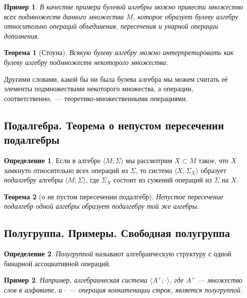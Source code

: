 \documentclass{article}
\newtheorem*{theorem*}{Теорема}
\theoremstyle{plain}
\newtheorem*{example*}{Пример}
\theoremstyle{definition}
\newtheorem{definition}{Определение}[subsection]
\begin{document}
\begin{example*}
	В качестве примера булевой алгебры можно привести множество всех подмножеств данного множества \(M\), которое образует булеву алгебру относительно операций объединения, пересечения и унарной операции дополнения.
\end{example*}

\begin{theorem*}[Стоуна]
	Всякую булеву алгебру можно интерпретировать как булеву алгебру подмножеств некоторого множества.
\end{theorem*}

Другими словами, какой бы ни была булева алгебра мы можем считать её элементы подмножествами некоторого множества, а операции, соответственно,~--- теоретико-множественными операциями.

\subsection{Подалгебра. Теорема о непустом пересечении подалгебры}

\begin{definition}
	Если в алгебре \(\langle M; \Sigma \rangle\) мы рассмотрим \(X \subset M\) такое, что \(X\) замкнуто относительно всех операций из \(\Sigma\), то система \(\langle X; \Sigma_X \rangle\) образует \textit{подалгебру} алгебры \(\langle M; \Sigma \rangle\), где \(\Sigma_X\) состоит из сужений операций из \(\Sigma\) на \(X\).
\end{definition}

\begin{theorem*}[о не пустом пересечении подалгебр]
	Непустое пересечение подалгебр одной алгебры образует подалгебру той же алгебры.
\end{theorem*}

\subsection{Полугруппа. Примеры. Свободная полугруппа}

\begin{definition}
	\textit{Полугруппой} называют алгебраическую структуру с одной бинарной ассоциативной операций.
\end{definition}

\begin{example*}
	Например, алгебраическая система \(\langle A^+; \cdot \rangle\), где \(A^+\) — множество слов в алфавите, а \(\cdot\) — операция конкатенации строк, является полугруппой.
\end{example*}
\end{document}
